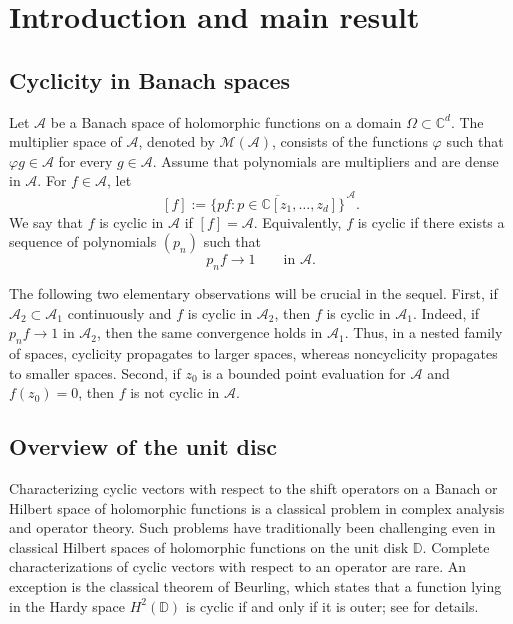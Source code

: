 \documentclass[a4paper,12pt]{amsart}
\theoremstyle{definition}
\begin{document}
\section{Introduction and main result}  
\subsection{Cyclicity in Banach spaces}
\noindent Let $\mathcal A$ be a Banach space of holomorphic functions on a
    domain $\Omega\subset\mathbb C^d$. The multiplier space of
    $\mathcal A$, denoted by $\mathcal M(\mathcal A)$, consists of the
    functions $\varphi$ such that $\varphi g\in\mathcal A$ for every
    $g\in\mathcal A$. Assume that polynomials are multipliers and are
    dense in $\mathcal A$. For $f\in\mathcal A$, let
    \[
        [f]
        :=
        \overline{\{pf:p\in\mathbb C[z_1,\ldots,z_d]\}}^{\,\mathcal A}.
    \]
    We say that $f$ is cyclic in $\mathcal A$ if $[f]=\mathcal A$.
    Equivalently, $f$ is cyclic if there exists a sequence of polynomials
    $(p_n)$ such that
    \[
        p_nf\longrightarrow1
        \qquad\text{in }\mathcal A.
    \]

    The following two elementary observations will be crucial in the sequel. First, if
    $\mathcal A_2\subset\mathcal A_1$ continuously and $f$ is cyclic in
    $\mathcal A_2$, then $f$ is cyclic in $\mathcal A_1$. Indeed, if
    $p_nf\to1$ in $\mathcal A_2$, then the same convergence holds in
    $\mathcal A_1$. Thus, in a nested family of spaces, cyclicity propagates
    to larger spaces, whereas noncyclicity propagates to smaller spaces.
    Second, if $z_0$ is a bounded point evaluation for $\mathcal A$ and
    $f(z_0)=0$, then $f$ is not cyclic in $\mathcal A$.
\subsection{Overview of the unit disc}
    Characterizing cyclic vectors with respect to the shift operators on a Banach or Hilbert space of holomorphic functions is a classical problem in complex analysis and operator theory. Such problems have traditionally been challenging even in classical Hilbert
spaces of holomorphic functions on the unit disk $\mathbb{D}.$
Complete characterizations of cyclic vectors with respect to an operator are rare. An exception is the classical theorem of Beurling, which states that a function lying in the Hardy space \(H^2(\mathbb D)\) is cyclic
if and only if it is outer; see \cite{Beurling1949} for details. 
\end{document}
